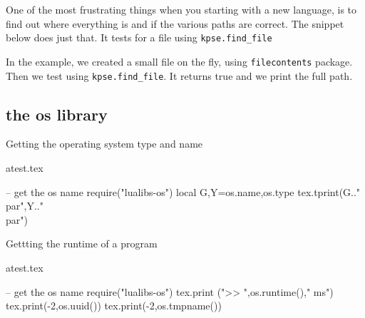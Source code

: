 One of the most frustrating things when you starting with a new language, is to find out where
everything is and if the various paths are correct. The snippet below does just that. It tests for a file using \lstinline!kpse.find_file!
\bigskip


In the example, we created a small file on the fly, using \lstinline!filecontents! package. Then we test using \lstinline!kpse.find_file!. It returns true and we print the full path.

\subsection{the os library}
Getting the operating system type and name
\begin{tcblisting}{}
\begin{filecontents}{atest.tex}
\end{filecontents}
\begin{luacode}
  -- get the os name
  require("lualibs-os")
  local G,Y=os.name,os.type
  tex.tprint({G.."\\par"},{Y.."\\par"})
\end{luacode}
\end{tcblisting}

Gettting the runtime of a program

\begin{texexample}{}{}
\begin{filecontents}{atest.tex}
\end{filecontents}
\begin{luacode}
  -- get the os name
  require("lualibs-os")
  tex.print (">> ",os.runtime()," ms")
  tex.print({-2,os.uuid()})
  tex.print({-2,os.tmpname()})
\end{luacode}
\end{texexample}



